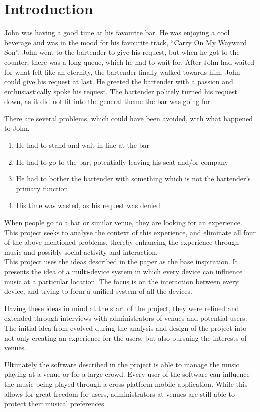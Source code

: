 \chapter{Introduction}\label{introduction} John was having a good time
at his favourite bar. He was enjoying a cool beverage and was in the
mood for his favourite track, \enquote{Carry On My Wayward Son}. John
went to the bartender to give his request, but when he got to the
counter, there was a long queue, which he had to wait for. After John
had waited for what felt like an eternity, the bartender finally walked
towards him. John could give his request at last. He greeted the
bartender with a passion and enthusiastically spoke his request. The
bartender politely turned his request down, as it did not fit into the
general theme the bar was going for.

There are several problems, which could have been avoided, with what
happened to John.
\begin{enumerate}
	\item He had to stand and wait in line at the bar
	\item He had to go to the bar, potentially leaving his seat and/or
company
	\item He had to bother the bartender with something which is
not the bartender's primary function
	\item His time was wasted, as his request was denied
\end{enumerate}

When people go to a bar or similar venue, they are looking for an
experience. This project seeks to analyse the context of this
experience, and eliminate all four of the above mentioned problems,
thereby enhancing the experience through music and possibly social
activity and interaction.\\

This project uses the ideas described in the paper  as the
base inspiration. It presents the idea of a multi-device system in
which every device can influence music at a particular location. The
focus is on the interaction between every device, and trying to form a
unified system of all the devices.

Having these ideas in mind at the start of the
project, they were refined and extended through interviews with
administrators of venues and potential users. The initial idea from
 evolved during the analysis and design of the
project into not only creating an experience for the users, but also
pursuing the interests of venues.

Ultimately the software described in the project is able to manage
the music playing at a venue or for a large crowd. Every user of the
software can influence the music being played through a cross platform
mobile application. While this allows for great freedom for users,
administrators at venues are still able to protect their musical
preferences.
